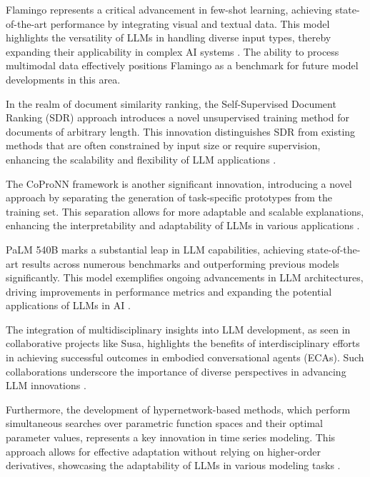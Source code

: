 Flamingo represents a critical advancement in few-shot learning, achieving state-of-the-art performance by integrating visual and textual data. This model highlights the versatility of LLMs in handling diverse input types, thereby expanding their applicability in complex AI systems \cite{alayrac2022flamingo}. The ability to process multimodal data effectively positions Flamingo as a benchmark for future model developments in this area.

In the realm of document similarity ranking, the Self-Supervised Document Ranking (SDR) approach introduces a novel unsupervised training method for documents of arbitrary length. This innovation distinguishes SDR from existing methods that are often constrained by input size or require supervision, enhancing the scalability and flexibility of LLM applications \cite{ginzburg2021selfsuperviseddocumentsimilarityranking}.

The CoProNN framework is another significant innovation, introducing a novel approach by separating the generation of task-specific prototypes from the training set. This separation allows for more adaptable and scalable explanations, enhancing the interpretability and adaptability of LLMs in various applications \cite{chiaburu2024copronnconceptbasedprototypicalnearest}.

PaLM 540B marks a substantial leap in LLM capabilities, achieving state-of-the-art results across numerous benchmarks and outperforming previous models significantly. This model exemplifies ongoing advancements in LLM architectures, driving improvements in performance metrics and expanding the potential applications of LLMs in AI \cite{chowdhery2023palm}.

The integration of multidisciplinary insights into LLM development, as seen in collaborative projects like Susa, highlights the benefits of interdisciplinary efforts in achieving successful outcomes in embodied conversational agents (ECAs). Such collaborations underscore the importance of diverse perspectives in advancing LLM innovations \cite{korre2023takesvillagemultidisciplinaritycollaboration}.

Furthermore, the development of hypernetwork-based methods, which perform simultaneous searches over parametric function spaces and their optimal parameter values, represents a key innovation in time series modeling. This approach allows for effective adaptation without relying on higher-order derivatives, showcasing the adaptability of LLMs in various modeling tasks \cite{stank2024designingtimeseriesmodelshypernetworks}.

